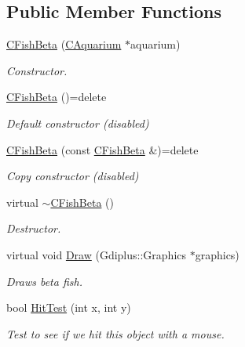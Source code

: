 \subsection*{Public Member Functions}
\begin{DoxyCompactItemize}
\item 
\hyperlink{class_c_fish_beta_a021073e2e0034271cd7e776b1e3fed29}{C\+Fish\+Beta} (\hyperlink{class_c_aquarium}{C\+Aquarium} $\ast$aquarium)
\begin{DoxyCompactList}\small\item\em Constructor. \end{DoxyCompactList}\item 
\mbox{\label{class_c_fish_beta_a4e4d132618735adad44d04c9c40687ca}} 
\hyperlink{class_c_fish_beta_a4e4d132618735adad44d04c9c40687ca}{C\+Fish\+Beta} ()=delete
\begin{DoxyCompactList}\small\item\em Default constructor (disabled) \end{DoxyCompactList}\item 
\mbox{\label{class_c_fish_beta_adbf3559baac135dff393729c51b1ab31}} 
\hyperlink{class_c_fish_beta_adbf3559baac135dff393729c51b1ab31}{C\+Fish\+Beta} (const \hyperlink{class_c_fish_beta}{C\+Fish\+Beta} \&)=delete
\begin{DoxyCompactList}\small\item\em Copy constructor (disabled) \end{DoxyCompactList}\item 
virtual \hyperlink{class_c_fish_beta_abd932894ad25a70f03c79c4f0f00fff4}{$\sim$\+C\+Fish\+Beta} ()
\begin{DoxyCompactList}\small\item\em Destructor. \end{DoxyCompactList}\item 
virtual void \hyperlink{class_c_fish_beta_ae2effbff7b98bb3cd6e1070d61d5366e}{Draw} (Gdiplus\+::\+Graphics $\ast$graphics)
\begin{DoxyCompactList}\small\item\em Draws beta fish. \end{DoxyCompactList}\item 
bool \hyperlink{class_c_fish_beta_a5bdd3d07a57ca1f01a7f2c5c00e0a662}{Hit\+Test} (int x, int y)
\begin{DoxyCompactList}\small\item\em Test to see if we hit this object with a mouse. \end{DoxyCompactList}\end{DoxyCompactItemize}
